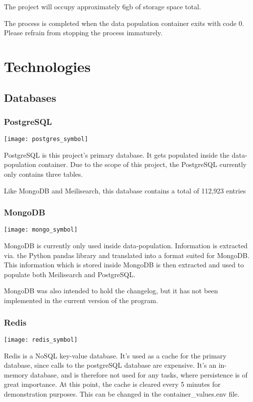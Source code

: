 \documentclass[a4paper, 12pt]{article}
\begin{document}
The project will occupy approximately 6gb of storage space total. 

The process is completed when the data population container exits with code 0. Please refrain from stopping the process immaturely. 

\section{Technologies}
\subsection{Databases}
\subsubsection{PostgreSQL}
\texttt{[image: postgres\_symbol]}

PostgreSQL is this project's primary database. It gets populated inside the data-population container. Due to the scope of this project, the PostgreSQL currently only contains three tables. 

Like MongoDB and Meilisearch, this database contains a total of 112,923 entries

\subsubsection{MongoDB}
\texttt{[image: mongo\_symbol]}

MongoDB is currently only used inside data-population. Information is extracted via. the Python pandas library and translated into a format suited for MongoDB. This information which is stored inside MongoDB is then extracted and used to populate both Meilisearch and PostgreSQL.

MongoDB was also intended to hold the changelog, but it has not been implemented in the current version of the program.

\subsubsection{Redis}
\texttt{[image: redis\_symbol]}

Redis is a NoSQL key-value database. It's used as a cache for the primary database, since calls to the postgreSQL database are expensive. It's an in-memory database, and is therefore not used for any tasks, where persistence is of great importance. At this point, the cache is cleared every 5 minutes for demonstration purposes. This can be changed in the container\_values.env file.
\end{document}
